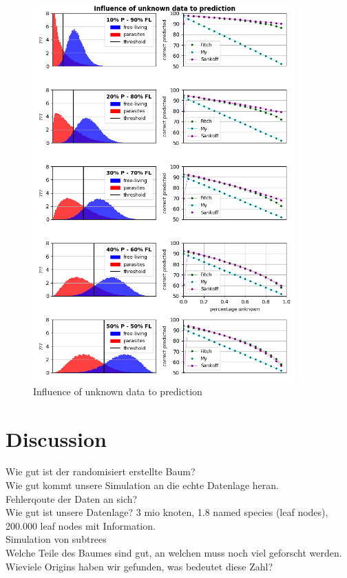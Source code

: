     \begin{figure}
      \caption{Influence of unknown data to prediction}
      \centering
      \includegraphics[width=0.9\textwidth]{Figures/simulation_evaluation_1.png}
    \end{figure}
  
\chapter{Discussion}
  Wie gut ist der randomisiert erstellte Baum? \\
  Wie gut kommt unsere Simulation an die echte Datenlage heran. \\
  Fehlerqoute der Daten an sich? \\
  Wie gut ist unsere Datenlage? 3 mio knoten, 1.8 named species (leaf nodes), 200.000 leaf nodes mit 
  Information. \\
  Simulation von subtrees \\
  Welche Teile des Baumes sind gut, an welchen muss noch viel geforscht werden. \\
  Wieviele Origins haben wir gefunden, was bedeutet diese Zahl? \\
  
